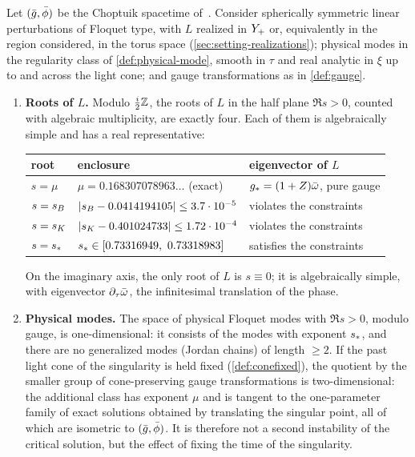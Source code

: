 \begin{mainthm}
Let $(\bar g,\bar\phi)$ be the Choptuik spacetime of~\cite{RT2019}. Consider spherically symmetric linear
perturbations of Floquet type, with $L$ realized in $Y_{+}$ or, equivalently in the region considered, in the torus
space (\cref{sec:setting-realizations}); physical modes in the regularity class of \cref{def:physical-mode}, smooth in
$\tau$ and real analytic in $\xi$ up to and across the light cone; and gauge transformations as in
\cref{def:gauge}.
\begin{enumerate}[label=\textup{(\arabic*)},leftmargin=*]
\item \textbf{Roots of $L$.} Modulo $\tfrac{i}{2}\mathbb{Z}$, the roots of $L$ in the half plane $\Re s>0$, counted
  with algebraic multiplicity, are exactly four. Each of them is algebraically simple and has a real
  representative:
  \begin{center}
  \begin{tabular}{@{}lll@{}}
  \toprule
  root & enclosure & eigenvector of $L$ \\
  \midrule
  $s=\mu$ & $\mu=0.168307078963\ldots$ (exact) & $g_*=(1+Z)\bar\omega$, pure gauge \\
  $s=s_{B}$ & $|s_{B}-0.0414194105|\le 3.7\cdot10^{-5}$ & violates the constraints \\
  $s=s_{K}$ & $|s_{K}-0.401024733|\le 1.72\cdot10^{-4}$ & violates the constraints \\
  $s=s_{\ast}$ & $s_{\ast}\in[0.73316949,\ 0.73318983]$ & satisfies the constraints \\
  \bottomrule
  \end{tabular}
  \end{center}
  On the imaginary axis, the only root of $L$ is $s\equiv 0$; it is algebraically simple, with eigenvector
  $\partial_\tau\bar\omega$, the infinitesimal translation of the phase.
\item \textbf{Physical modes.} The space of physical Floquet modes with $\Re s>0$, modulo gauge, is
  one-dimensional: it consists of the modes with exponent $s_{\ast}$, and there are no generalized modes
  \textup{(}Jordan chains\textup{)} of length $\ge2$. If the past light cone of the singularity is held fixed
  (\cref{def:conefixed}), the quotient by the smaller group of cone-preserving gauge transformations is
  two-dimensional: the additional class has exponent $\mu$ and is tangent to the one-parameter family of
  exact solutions obtained by translating the singular point, all of which are isometric to
  $(\bar g,\bar\phi)$. It is therefore not a second instability of the critical solution, but the effect of
  fixing the time of the singularity.
\end{enumerate}
\end{mainthm}

